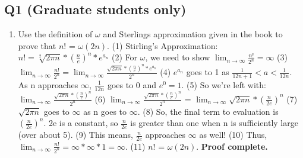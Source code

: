 \documentclass{article}
\begin{document}
\subsection*{Q1 (Graduate students only)}
\begin{enumerate}[label=(\alph*)]
    \item Use the definition of $\omega$ and Sterlings approximation given in the book to prove that $n!$ = $\omega(2n)$.
    \subitem (1) Stirling's Approximation: $n! = \sqrt[2]{2 \pi n} * (\frac{n}{e})^n*e^{a_{n}}$
    \subitem (2) For $\omega$, we need to show $\lim_{n\to\infty} \frac{n!}{2^n} = \infty$
    \subitem (3)  $\lim_{n\to\infty} \frac{n!}{2^n} = \lim_{n\to\infty} \frac{\sqrt{2 \pi n} * (\frac{n}{e})^n*e^{a_{n}}}{2^n}$
    \subitem (4) $e^{a_{n}}$ goes to 1 as $\frac{1}{12n+1} < a < \frac{1}{12n}$. As n approaches $\infty$, $\frac{1}{12n}$ goes to 0 and $e^0 = 1$.
    \subitem (5) So we're left with: $\lim_{n\to\infty} \frac{\sqrt{2 \pi n} * (\frac{n}{e})^n}{2^n}$
    \subitem (6) $\lim_{n\to\infty} \frac{\sqrt{2 \pi n} * (\frac{n}{e})^n}{2^n}$ = $\lim_{n\to\infty} \sqrt{2 \pi n} * (\frac{n}{2e})^n$
    \subitem (7) $\sqrt{2 \pi n}$ goes to $\infty$ as n goes to $\infty$.
    \subitem (8) So, the final term to evaluation is $(\frac{n}{2e})^n$. 2e is a constant, so $\frac{n}{2e}$ is greater than one when n is sufficiently large (over about 5).
    \subitem (9) This means, $\frac{n}{2e}$ approaches $\infty$ as well!
    \subitem (10) Thus, $\lim_{n\to\infty} \frac{n!}{2^n} = \infty*\infty*1 = \infty$.
    \subitem (11) $n!$ = $\omega(2n)$. \textbf{Proof complete.}


\end{enumerate}

\end{document}
